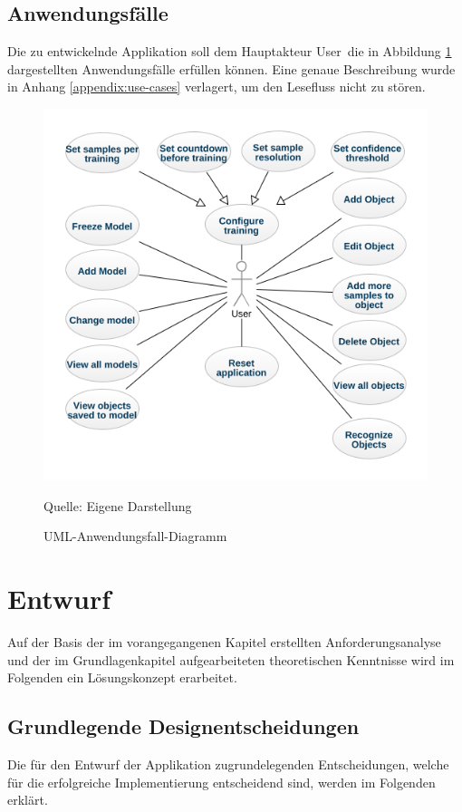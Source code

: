 \documentclass[oneside]{ausarbeitung}
\begin{document}
\section{Anwendungsfälle}
Die zu entwickelnde Applikation soll dem Hauptakteur \glqq User\grqq\ die in Abbildung \ref{fig:usecase-diagram} dargestellten Anwendungsfälle erfüllen können. Eine genaue Beschreibung wurde in Anhang \ref{appendix:use-cases} verlagert, um den Lesefluss nicht zu stören. 
\begin{figure}[hptb]
	\centering
	\includegraphics[height=0.6\textheight]{images/usecase-diagram.png}
	\caption{UML-Anwendungsfall-Diagramm} Quelle: Eigene Darstellung
	\label{fig:usecase-diagram}
\end{figure}
\chapter{Entwurf}
\label{cha:Entwurf}
Auf der Basis der im vorangegangenen Kapitel erstellten Anforderungsanalyse 
und der im Grundlagenkapitel aufgearbeiteten theoretischen Kenntnisse 
wird im Folgenden ein Lösungskonzept erarbeitet.
\section{Grundlegende Designentscheidungen}
Die für den Entwurf der Applikation zugrundelegenden Entscheidungen, welche für die erfolgreiche Implementierung entscheidend sind, werden im Folgenden erklärt.
\end{document}
